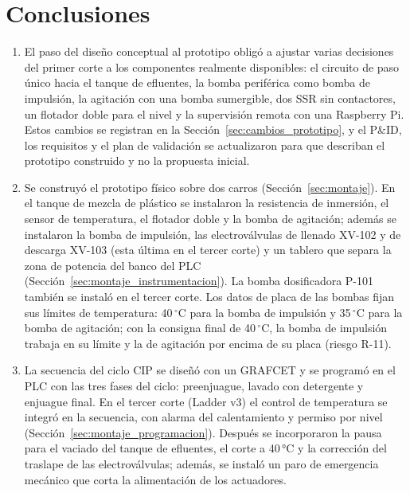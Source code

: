\section{Conclusiones}

\begin{enumerate}

\item El paso del diseño conceptual al prototipo obligó a ajustar varias decisiones del primer corte a los componentes realmente disponibles: el circuito de paso único hacia el tanque de efluentes, la bomba periférica como bomba de impulsión, la agitación con una bomba sumergible, dos SSR sin contactores, un flotador doble para el nivel y la supervisión remota con una Raspberry Pi. Estos cambios se registran en la Sección~\ref{sec:cambios_prototipo}, y el P\&ID, los requisitos y el plan de validación se actualizaron para que describan el prototipo construido y no la propuesta inicial.

\item Se construyó el prototipo físico sobre dos carros (Sección~\ref{sec:montaje}). En el tanque de mezcla de plástico se instalaron la resistencia de inmersión, el sensor de temperatura, el flotador doble y la bomba de agitación; además se instalaron la bomba de impulsión, las electroválvulas de llenado XV-102 y de descarga XV-103 (esta última en el tercer corte) y un tablero que separa la zona de potencia del banco del PLC (Sección~\ref{sec:montaje_instrumentacion}). La bomba dosificadora P-101 también se instaló en el tercer corte. Los datos de placa de las bombas fijan sus límites de temperatura: 40\,$^{\circ}$C para la bomba de impulsión y 35\,$^{\circ}$C para la bomba de agitación; con la consigna final de 40\,$^{\circ}$C, la bomba de impulsión trabaja en su límite y la de agitación por encima de su placa (riesgo R-11).

\item La secuencia del ciclo CIP se diseñó con un GRAFCET y se programó en el PLC con las tres fases del ciclo: preenjuague, lavado con detergente y enjuague final. En el tercer corte (Ladder v3) el control de temperatura se integró en la secuencia, con alarma del calentamiento y permiso por nivel (Sección~\ref{sec:montaje_programacion}). Después se incorporaron la pausa para el vaciado del tanque de efluentes, el corte a 40\,°C y la corrección del traslape de las electroválvulas; además, se instaló un paro de emergencia mecánico que corta la alimentación de los actuadores.


\end{enumerate}
